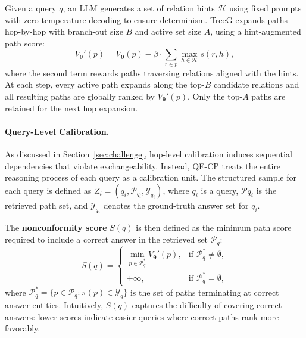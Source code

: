 \documentclass{article}
\theoremstyle{plain}
\theoremstyle{definition}
\theoremstyle{remark}
\begin{document}
Given a query $q$, an LLM generates a set of relation hints $\mathcal{H}$ using fixed prompts with zero-temperature decoding to ensure determinism. TreeG expands paths hop-by-hop with branch-out size $B$ and active set size $A$, using a hint-augmented path score:
\begin{equation}
\label{eq:llm_hint}
V_{\bm\theta}'(p) = V_{\bm\theta}(p) - \beta \cdot \sum_{r \in p} \max_{h \in \mathcal{H}} s(r, h),
\end{equation}
where the second term rewards paths traversing relations aligned with the hints. At each step, every active path expands along the top-$B$ candidate relations and all resulting paths are globally ranked by $V_{\bm\theta}'(p)$. Only the top-$A$ paths are retained for the next hop expansion. 

\paragraph{Query-Level Calibration.}
As discussed in Section~\ref{sec:challenge}, hop-level calibration induces 
sequential dependencies that violate exchangeability. Instead, QE-CP treats the entire reasoning process of each query as a calibration unit. The structured sample for each query is defined as 
$Z_i = (q_i, \mathcal{P}_{q_i}, \mathcal{Y}_{q_i})$, where $q_i$ is a query, $\mathcal{P}{q_i}$ is the retrieved path set, and $\mathcal{Y}_{q_i}$ denotes the ground-truth answer set for $q_i$.

The \textbf{nonconformity score} $S(q)$ is then defined as the minimum path score 
required to include a correct answer in the retrieved set $\mathcal{P}_q$:
\begin{equation}
S(q) = 
\begin{cases} 
\min_{p \in \mathcal{P}^*_q} V_{\bm\theta}'(p), & \text{if } \mathcal{P}^*_q \neq \emptyset, \\
+\infty, & \text{if } \mathcal{P}^*_q = \emptyset,
\end{cases}
\label{eq:qecp_score}
\end{equation}
where $\mathcal{P}^*_q = \{p \in \mathcal{P}_q : \pi(p) \in \mathcal{Y}_q\}$ is the set of
paths terminating at correct answer entities. Intuitively, $S(q)$ captures the 
difficulty of covering correct answers: lower scores indicate easier 
queries where correct paths rank more favorably.

\end{document}
